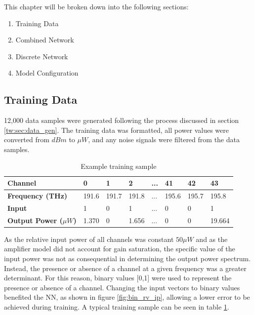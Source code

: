 This chapter will be broken down into the following sections:
\begin{enumerate}
    \item Training Data
    \item Combined Network
    \item Discrete Network
    \item Model Configuration
\end{enumerate}

\subsection{Training Data}\label{subsec:ml_model:data}
\FloatBarrier




12,000 data samples were generated following the process discussed in section \ref{tw:sec:data_gen}. The training data was formatted, all power values were converted from $dBm$ to $\mu W$, and any noise signals were filtered from the data samples.

\renewcommand{\arraystretch}{1.15}
\begin{table}[!h] 
    \centering
    \caption{Example training sample}
    
    \begin{tabular}[t]{l l l l l l l l }
        \textbf{Channel} & 0 & 1 & 2 & ... & 41 & 42 & 43 \\
        \hline
        \textbf{Frequency (THz)} & 191.6 & 191.7 & 191.8 & ... & 195.6 & 195.7 & 195.8 \\
        \hline
        \textbf{Input} & 1 & 0 & 1 & ... & 0 & 0 &	1 \\
        \hline
        \textbf{Output Power ($\mu W$)} & 1.370 & 0 & 1.656 & ... & 0 &	0 &	19.664 \\
        \hline
    \end{tabular}
    \label{tab:ex_data_sample}
\end{table}


As the relative input power of all channels was constant $50 \mu W$ and as the amplifier model did not account for gain saturation, the specific value of the input power was not as consequential in determining the output power spectrum. Instead, the presence or absence of a channel at a given frequency was a greater determinant. For this reason, binary values [0,1] were used to represent the presence or absence of a channel. Changing the input vectors to binary values benefited the NN, as shown in figure \ref{fig:bin_rv_ip}, allowing a lower error to be achieved during training. A typical training sample can be seen in table \ref{tab:ex_data_sample}.

